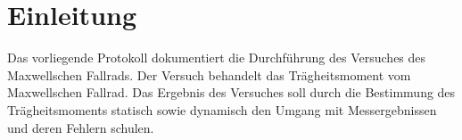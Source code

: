 \section{Einleitung}
Das vorliegende Protokoll dokumentiert die Durchführung des Versuches des Maxwellschen Fallrads.
Der Versuch behandelt das Trägheitsmoment vom Maxwellschen Fallrad.
Das Ergebnis des Versuches soll durch die Bestimmung des Trägheitsmoments statisch sowie dynamisch den Umgang mit Messergebnissen und deren Fehlern schulen.